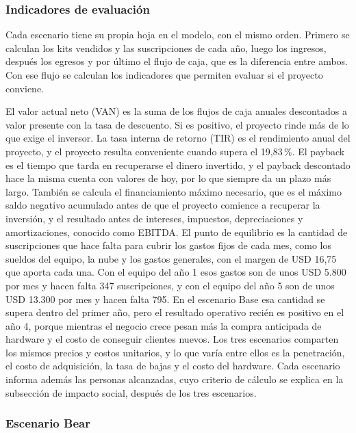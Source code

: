 
\subsubsection{Indicadores de evaluación}

Cada escenario tiene su propia hoja en el modelo, con el mismo orden.
Primero se calculan los kits vendidos y las suscripciones de cada año, luego los ingresos, después los egresos y por último el flujo de caja, que es la diferencia entre ambos.
Con ese flujo se calculan los indicadores que permiten evaluar si el proyecto conviene.

El valor actual neto (VAN) es la suma de los flujos de caja anuales descontados a valor presente con la tasa de descuento.
Si es positivo, el proyecto rinde más de lo que exige el inversor.
La tasa interna de retorno (TIR) es el rendimiento anual del proyecto, y el proyecto resulta conveniente cuando supera el 19,83\,\%.
El payback es el tiempo que tarda en recuperarse el dinero invertido, y el payback descontado hace la misma cuenta con valores de hoy, por lo que siempre da un plazo más largo.
También se calcula el financiamiento máximo necesario, que es el máximo saldo negativo acumulado antes de que el proyecto comience a recuperar la inversión, y el resultado antes de intereses, impuestos, depreciaciones y amortizaciones, conocido como EBITDA.
El punto de equilibrio es la cantidad de suscripciones que hace falta para cubrir los gastos fijos de cada mes, como los sueldos del equipo, la nube y los gastos generales, con el margen de USD 16,75 que aporta cada una.
Con el equipo del año 1 esos gastos son de unos USD 5.800 por mes y hacen falta 347 suscripciones, y con el equipo del año 5 son de unos USD 13.300 por mes y hacen falta 795.
En el escenario Base esa cantidad se supera dentro del primer año, pero el resultado operativo recién es positivo en el año 4, porque mientras el negocio crece pesan más la compra anticipada de hardware y el costo de conseguir clientes nuevos.
Los tres escenarios comparten los mismos precios y costos unitarios, y lo que varía entre ellos es la penetración, el costo de adquisición, la tasa de bajas y el costo del hardware.
Cada escenario informa además las personas alcanzadas, cuyo criterio de cálculo se explica en la subsección de impacto social, después de los tres escenarios.

\subsubsection{Escenario Bear}

